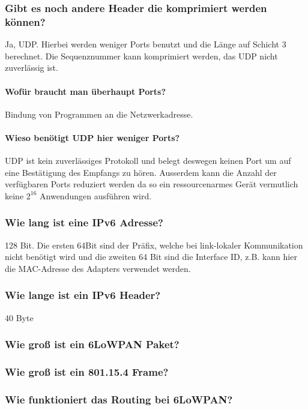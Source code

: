 		\subsubsection{Gibt es noch andere Header die komprimiert werden können?}
		Ja, UDP. Hierbei werden weniger Ports benutzt und die Länge auf Schicht 3 berechnet. Die Sequenznummer kann komprimiert werden, das UDP nicht zuverlässig ist.
		\paragraph{Wofür braucht man überhaupt Ports?} Bindung von Programmen an die Netzwerkadresse.
		\paragraph{Wieso benötigt UDP hier weniger Ports?} UDP ist kein zuverlässiges Protokoll und belegt deswegen keinen Port um auf eine Bestätigung des Empfangs zu hören.	Ausserdem kann die Anzahl der verfügbaren Ports reduziert werden da so ein ressourcenarmes Gerät vermutlich keine $2^{16}$ Anwendungen ausführen wird.	
		
		
		
		
		
		\subsubsection{Wie lang ist eine IPv6\- Adresse?}
		128 Bit. Die ersten 64Bit sind der Präfix, welche bei link-lokaler Kommunikation nicht benötigt wird und die zweiten 64 Bit sind die Interface ID, z.B. kann hier die MAC-Adresse des Adapters verwendet werden.
		\subsubsection{Wie lange ist ein IPv6\- Header?}
		40 Byte
		\subsubsection{Wie groß ist ein 6LoWPAN Paket?}
		\subsubsection{Wie groß ist ein 801.15.4 Frame?}
		
		\subsubsection{Wie funktioniert das Routing bei 6LoWPAN?}
		
